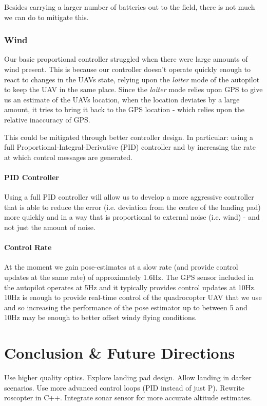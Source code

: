 \documentclass[10pt]{scrartcl} %
\begin{document}
Besides carrying a larger number of batteries out to the field, there is not much we can do to mitigate this.

\subsubsection{Wind}
Our basic proportional controller struggled when there were large amounts of wind present. This is because our controller doesn't operate quickly enough to react to changes in the UAVs state, relying upon the \textit{loiter} mode of the autopilot to keep the UAV in the same place. Since the \textit{loiter} mode relies upon GPS to give us an estimate of the UAVs location, when the location deviates by a large amount, it tries to bring it back to the GPS location - which relies upon the relative inaccuracy of GPS.

This could be mitigated through better controller design. In particular: using a full Proportional-Integral-Derivative (PID) controller and by increasing the rate at which control messages are generated.

\paragraph{PID Controller}
Using a full PID controller will allow us to develop a more aggressive controller that is able to reduce the error (i.e. deviation from the centre of the landing pad) more quickly and in a way that is proportional to external noise (i.e. wind) - and not just the amount of noise.

\paragraph{Control Rate}
At the moment we gain pose-estimates at a slow rate (and provide control updates at the same rate) of approximately 1.6Hz. The GPS sensor included in the autopilot operates at 5Hz and it typically provides control updates at 10Hz. 10Hz is enough to provide real-time control of the quadrocopter UAV that we use and so increasing the performance of the pose estimator up to between 5 and 10Hz may be enough to better offset windy flying conditions.

\section{Conclusion \& Future Directions}

Use higher quality optics.
Explore landing pad design.
Allow landing in darker scenarios.
Use more advanced control loops (PID instead of just P).
Rewrite roscopter in C++.
Integrate sonar sensor for more accurate altitude estimates.

\printbibliography
\end{document}
